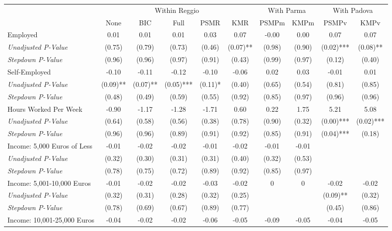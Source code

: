 \begin{tabular}{l c c c c c c c c c}
\toprule
& \multicolumn{5}{c}{Within Reggio} & \multicolumn{2}{c}{With Parma} & \multicolumn{2}{c}{With Padova} \\\cmidrule(lr){2-6} \cmidrule(lr){7-8} \cmidrule(lr){9-10}
 & None & BIC & Full & PSMR & KMR & PSMPm & KMPm & PSMPv & KMPv \\
\midrule
Employed & 0.01 & 0.01 & 0.01 & 0.03 & 0.07 & -0.00 & 0.00 & 0.07 & 0.07 \\
\quad \textit{Unadjusted P-Value} & (0.75) & (0.79) & (0.73) & (0.46) & (0.07)** & (0.98) & (0.90) & (0.02)*** & (0.08)** \\
\quad \textit{Stepdown P-Value} & (0.96) & (0.96) & (0.97) & (0.91) & (0.43) & (0.99) & (0.97) & (0.12) & (0.40) \\
Self-Employed & -0.10 & -0.11 & -0.12 & -0.10 & -0.06 & 0.02 & 0.03 & -0.01 & 0.01 \\
\quad \textit{Unadjusted P-Value} & (0.09)** & (0.07)** & (0.05)*** & (0.11)* & (0.40) & (0.65) & (0.54) & (0.81) & (0.85) \\
\quad \textit{Stepdown P-Value} & (0.48) & (0.49) & (0.59) & (0.55) & (0.92) & (0.85) & (0.97) & (0.96) & (0.96) \\
Hours Worked Per Week & -0.90 & -1.17 & -1.28 & -1.71 & 0.60 & 0.22 & 1.75 & 5.21 & 5.08 \\
\quad \textit{Unadjusted P-Value} & (0.64) & (0.58) & (0.56) & (0.38) & (0.78) & (0.90) & (0.32) & (0.00)*** & (0.02)*** \\
\quad \textit{Stepdown P-Value} & (0.96) & (0.96) & (0.89) & (0.91) & (0.92) & (0.85) & (0.91) & (0.04)*** & (0.18) \\
Income: 5,000 Euros of Less & -0.01 & -0.02 & -0.02 & -0.01 & -0.02 & -0.01 & -0.01 &  &  \\
\quad \textit{Unadjusted P-Value} & (0.32) & (0.30) & (0.31) & (0.31) & (0.40) & (0.32) & (0.53) & & \\
\quad \textit{Stepdown P-Value} & (0.78) & (0.75) & (0.72) & (0.89) & (0.92) & (0.85) & (0.97) &  &  \\
Income: 5,001-10,000 Euros & -0.01 & -0.02 & -0.02 & -0.03 & -0.02 & 0 & 0 & -0.02 & -0.02 \\
\quad \textit{Unadjusted P-Value} & (0.32) & (0.31) & (0.28) & (0.32) & (0.25) & & & (0.09)** & (0.32) \\
\quad \textit{Stepdown P-Value} & (0.78) & (0.69) & (0.67) & (0.89) & (0.77) &  &  & (0.45) & (0.86) \\
Income: 10,001-25,000 Euros & -0.04 & -0.02 & -0.02 & -0.06 & -0.05 & -0.09 & -0.05 & -0.04 & -0.05 \\

\end{tabular}
